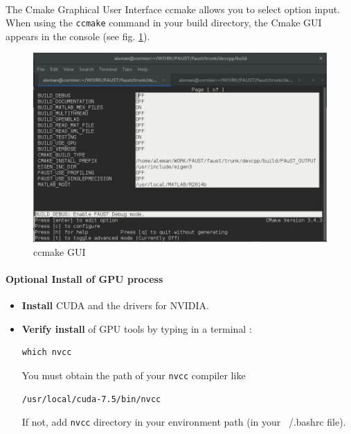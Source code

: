 \paragraph{}The Cmake Graphical User Interface ccmake allows you to select option input. When using the \texttt{ccmake} command in your build directory, the Cmake GUI appears in the console (see fig. \ref{fig:ccmake}).

\begin{figure}[!h] %
\centering
\includegraphics[scale=0.5]{images/ccmake.jpg}
\caption{ccmake GUI}
\label{fig:ccmake}
\end{figure}


\paragraph{Optional Install of GPU process}
\begin{itemize}
\item \textbf{Install} CUDA and the drivers for NVIDIA.
\item \textbf{Verify install} of GPU tools by typing in a terminal : 
\begin{lstlisting}
which nvcc
\end{lstlisting}
You must obtain the path of your \texttt{nvcc} compiler like 
\begin{lstlisting}
/usr/local/cuda-7.5/bin/nvcc
\end{lstlisting}
If not, add \texttt{nvcc} directory in your environment path (in your ~/.bashrc file). 

\end{itemize}




